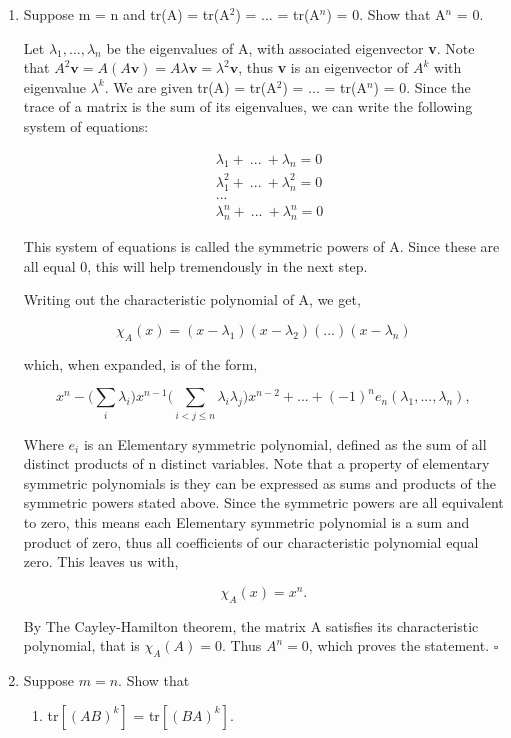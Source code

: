 \documentclass[12pt]{article}
\newcommand{\hop}{\vspace{1mm}}
\newcommand{\jump}{\vspace{5mm}}
\newcommand{\lm}{\lambda}
\begin{document}
\begin{enumerate}[leftmargin=\labelsep]
\begin{enumerate}
\jump
\item Suppose m = n and tr(A) = tr(A$^2$) = ... = tr(A$^n$) = 0. Show that A$^n$ = 0.

\jump
Let $\lm_1, ..., \lm_n$ be the eigenvalues of A, with associated eigenvector \textbf{v}. Note that $A^2\textbf{v} = A(A\textbf{v}) = A\lm\textbf{v} = \lm^2\textbf{v}$, thus \textbf{v} is an eigenvector of $A^k$ with eigenvalue $\lm^k$. We are given tr(A) = tr(A$^2$) = ... = tr(A$^n$) = 0. Since the trace of a matrix is the sum of its eigenvalues, we can write the following system of equations:

\begin{align*}
    &\lm_1 + \ ... \ + \lm_n = 0  \\
    &\lm_1^2 + \ ... \ + \lm_n^2 = 0 \\
    &... \\
    &\lm_n^n + \ ... \ + \lm_n^n = 0
\end{align*}

This system of equations is called the symmetric powers of A. Since these are all equal 0, this will help tremendously in the next step. 

\hop
Writing out the characteristic polynomial of A, we get,

\[
\chi_A(x) = (x - \lm_1)(x-\lm_2)(...)(x-\lm_n)
\]

which, when expanded, is of the form,

\[
x^n - \bigg(\sum_i\lm_i\bigg)x^{n-1} \bigg(\sum_{i<j\leq n} \lm_i\lm_j\bigg)x^{n - 2} + ... + (-1)^ne_n(\lm_1, ..., \lm_n),
\]

Where $e_i$ is an Elementary symmetric polynomial, defined as the sum of all distinct products of n distinct variables. Note that a property of elementary symmetric polynomials is they can be expressed as sums and products of the symmetric powers stated above. Since the symmetric powers are all equivalent to zero, this means each Elementary symmetric polynomial is a sum and product of zero, thus all coefficients of our characteristic polynomial equal zero. This leaves us with,

\[
\chi_A(x) = x^n.
\]

By The Cayley-Hamilton theorem, the matrix A satisfies its characteristic polynomial, that is $\chi_A(A) = 0$. Thus $A^n = 0$, which proves the statement. $\square$
\hop
\item Suppose $m = n$. Show that
    \begin{enumerate}
        \item tr$[(AB)^{k}]$ = tr$[(BA)^k]$.


\end{enumerate}
\end{enumerate}
\end{enumerate}
\end{document}
